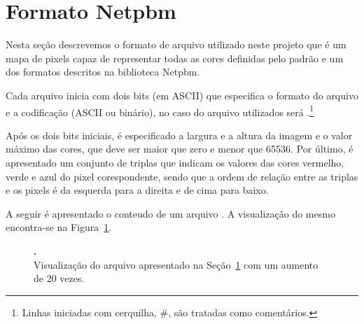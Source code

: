 %
%
%

\section{Formato Netpbm} \label{sse:Netpbm}
Nesta seção descrevemos o formato de arquivo  utilizado neste projeto
que é um mapa de pixels capaz de representar todas as cores definidas pelo
padrão  e um dos formatos descritos na biblioteca
Netpbm.\nocite{wiki:Netpbm_format, Henderson:Netpbm}

Cada arquivo inicia com dois bits (em ASCII) que especifica o formato do arquivo
e a codificação (ASCII ou binário), no caso do arquivo  utilizados
será .\footnote{Linhas iniciadas com cerquilha, \#, são tratadas
como comentários.}

Após os dois bits iniciais, é especificado a largura e a altura da imagem e o
valor máximo das cores, que deve ser maior que zero e menor que 65536. Por
último, é apresentado um conjunto de triplas que indicam os valores das cores
vermelho, verde e azul do pixel corespondente, sendo que a ordem de relação
entre as triplas e os pixels é da esquerda para a direita e de cima para baixo.

A seguir é apresentado o conteudo de um arquivo . A visualização do
mesmo encontra-se na Figura~\ref{fig:minimal.ppm}.

\begin{figure}[!htb]
    \begin{center}
        \includegraphics[scale=20]{../src/test/minimal.png}
    \end{center}
    \caption{Visualização do arquivo  apresentado na
    Seção~\ref{sse:Netpbm} com um aumento de 20 vezes.}
    \label{fig:minimal.ppm}
\end{figure}

